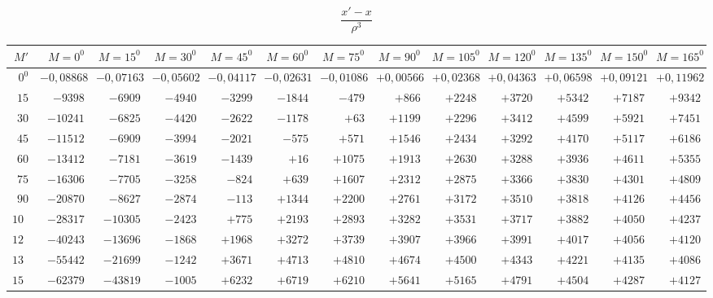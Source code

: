 \clearpage
\begin{landscape}
\begingroup
\scriptsize
\setlength{\tabcolsep}{2pt}
\renewcommand{\arraystretch}{1.12}
\[\frac{x'-x}{\rho^3}\]
\begin{center}
\begin{tabular}{@{}r|*{11}{r|}r@{}}
\hline
\(M'\) & \(M=0^0\) & \(M=15^0\) & \(M=30^0\) & \(M=45^0\) & \(M=60^0\) & \(M=75^0\) & \(M=90^0\) & \(M=105^0\) & \(M=120^0\) & \(M=135^0\) & \(M=150^0\) & \(M=165^0\)\\
\hline
\(0^0\) & \(-0{,}08868\) & \(-0{,}07163\) & \(-0{,}05602\) & \(-0{,}04117\) & \(-0{,}02631\) & \(-0{,}01086\) & \(+0{,}00566\) & \(+0{,}02368\) & \(+0{,}04363\) & \(+0{,}06598\) & \(+0{,}09121\) & \(+0{,}11962\)\\
\(15\) & \(-9398\) & \(-6909\) & \(-4940\) & \(-3299\) & \(-1844\) & \(-479\) & \(+866\) & \(+2248\) & \(+3720\) & \(+5342\) & \(+7187\) & \(+9342\)\\
\(30\) & \(-10241\) & \(-6825\) & \(-4420\) & \(-2622\) & \(-1178\) & \(+63\) & \(+1199\) & \(+2296\) & \(+3412\) & \(+4599\) & \(+5921\) & \(+7451\)\\
\(45\) & \(-11512\) & \(-6909\) & \(-3994\) & \(-2021\) & \(-575\) & \(+571\) & \(+1546\) & \(+2434\) & \(+3292\) & \(+4170\) & \(+5117\) & \(+6186\)\\
\(60\) & \(-13412\) & \(-7181\) & \(-3619\) & \(-1439\) & \(+16\) & \(+1075\) & \(+1913\) & \(+2630\) & \(+3288\) & \(+3936\) & \(+4611\) & \(+5355\)\\
\(75\) & \(-16306\) & \(-7705\) & \(-3258\) & \(-824\) & \(+639\) & \(+1607\) & \(+2312\) & \(+2875\) & \(+3366\) & \(+3830\) & \(+4301\) & \(+4809\)\\
\(90\) & \(-20870\) & \(-8627\) & \(-2874\) & \(-113\) & \(+1344\) & \(+2200\) & \(+2761\) & \(+3172\) & \(+3510\) & \(+3818\) & \(+4126\) & \(+4456\)\\
\(105\) & \(-28317\) & \(-10305\) & \(-2423\) & \(+775\) & \(+2193\) & \(+2893\) & \(+3282\) & \(+3531\) & \(+3717\) & \(+3882\) & \(+4050\) & \(+4237\)\\
\(120\) & \(-40243\) & \(-13696\) & \(-1868\) & \(+1968\) & \(+3272\) & \(+3739\) & \(+3907\) & \(+3966\) & \(+3991\) & \(+4017\) & \(+4056\) & \(+4120\)\\
\(135\) & \(-55442\) & \(-21699\) & \(-1242\) & \(+3671\) & \(+4713\) & \(+4810\) & \(+4674\) & \(+4500\) & \(+4343\) & \(+4221\) & \(+4135\) & \(+4086\)\\
\(150\) & \(-62379\) & \(-43819\) & \(-1005\) & \(+6232\) & \(+6719\) & \(+6210\) & \(+5641\) & \(+5165\) & \(+4791\) & \(+4504\) & \(+4287\) & \(+4127\)\\

\end{tabular}
\end{center}
\end{landscape}
